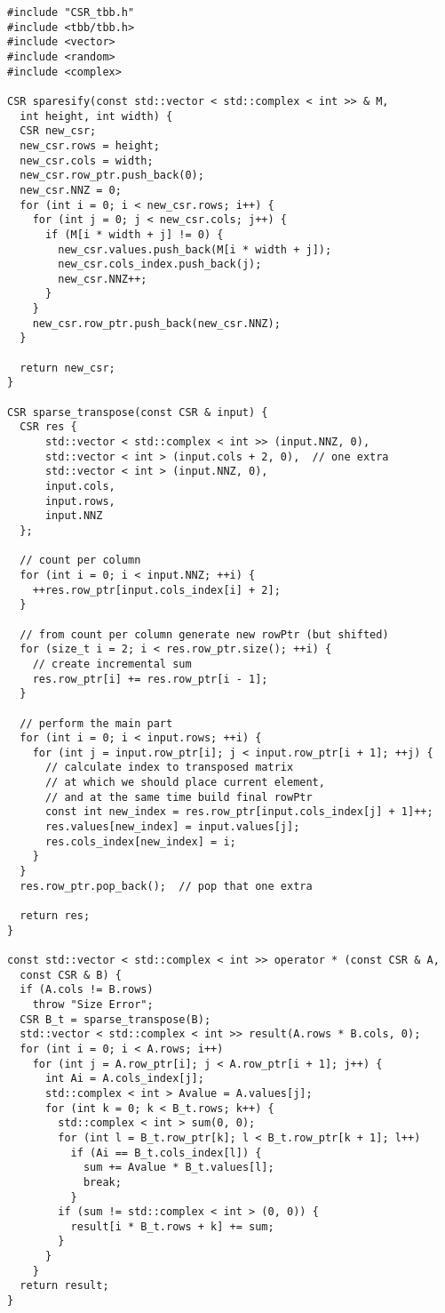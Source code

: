 \documentclass{report}
\begin{document}
\begin{lstlisting}
#include "CSR_tbb.h"
#include <tbb/tbb.h>
#include <vector>
#include <random>
#include <complex>

CSR sparesify(const std::vector < std::complex < int >> & M,
  int height, int width) {
  CSR new_csr;
  new_csr.rows = height;
  new_csr.cols = width;
  new_csr.row_ptr.push_back(0);
  new_csr.NNZ = 0;
  for (int i = 0; i < new_csr.rows; i++) {
    for (int j = 0; j < new_csr.cols; j++) {
      if (M[i * width + j] != 0) {
        new_csr.values.push_back(M[i * width + j]);
        new_csr.cols_index.push_back(j);
        new_csr.NNZ++;
      }
    }
    new_csr.row_ptr.push_back(new_csr.NNZ);
  }

  return new_csr;
}

CSR sparse_transpose(const CSR & input) {
  CSR res {
      std::vector < std::complex < int >> (input.NNZ, 0),
      std::vector < int > (input.cols + 2, 0),  // one extra
      std::vector < int > (input.NNZ, 0),
      input.cols,
      input.rows,
      input.NNZ
  };

  // count per column
  for (int i = 0; i < input.NNZ; ++i) {
    ++res.row_ptr[input.cols_index[i] + 2];
  }

  // from count per column generate new rowPtr (but shifted)
  for (size_t i = 2; i < res.row_ptr.size(); ++i) {
    // create incremental sum
    res.row_ptr[i] += res.row_ptr[i - 1];
  }

  // perform the main part
  for (int i = 0; i < input.rows; ++i) {
    for (int j = input.row_ptr[i]; j < input.row_ptr[i + 1]; ++j) {
      // calculate index to transposed matrix
      // at which we should place current element,
      // and at the same time build final rowPtr
      const int new_index = res.row_ptr[input.cols_index[j] + 1]++;
      res.values[new_index] = input.values[j];
      res.cols_index[new_index] = i;
    }
  }
  res.row_ptr.pop_back();  // pop that one extra

  return res;
}

const std::vector < std::complex < int >> operator * (const CSR & A,
  const CSR & B) {
  if (A.cols != B.rows)
    throw "Size Error";
  CSR B_t = sparse_transpose(B);
  std::vector < std::complex < int >> result(A.rows * B.cols, 0);
  for (int i = 0; i < A.rows; i++)
    for (int j = A.row_ptr[i]; j < A.row_ptr[i + 1]; j++) {
      int Ai = A.cols_index[j];
      std::complex < int > Avalue = A.values[j];
      for (int k = 0; k < B_t.rows; k++) {
        std::complex < int > sum(0, 0);
        for (int l = B_t.row_ptr[k]; l < B_t.row_ptr[k + 1]; l++)
          if (Ai == B_t.cols_index[l]) {
            sum += Avalue * B_t.values[l];
            break;
          }
        if (sum != std::complex < int > (0, 0)) {
          result[i * B_t.rows + k] += sum;
        }
      }
    }
  return result;
}


\end{lstlisting}
\end{document}
